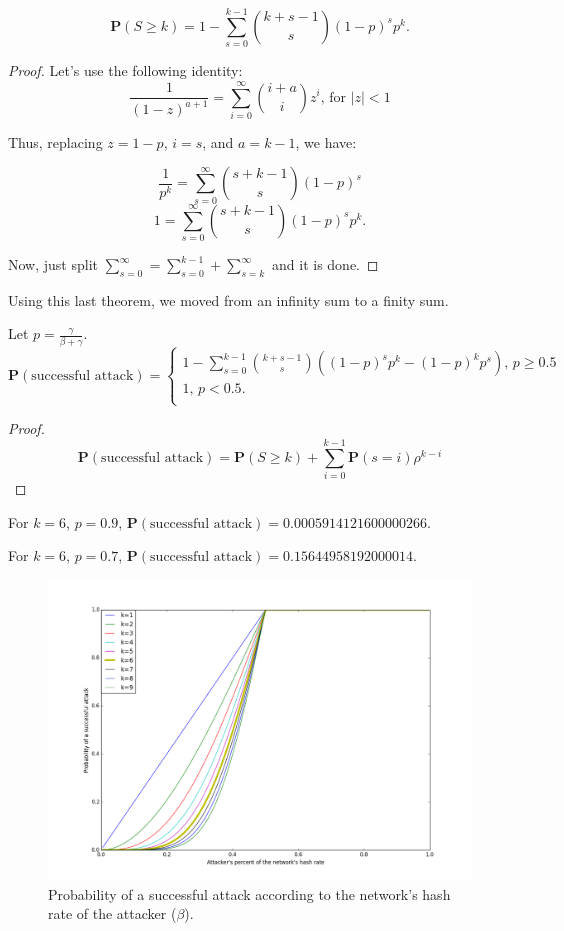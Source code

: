 \begin{theorem}
	$$\mathbf{P}(S \geq k) = 1 - \sum_{s=0}^{k-1} \binom{k+s-1}{s} (1-p)^s p^k.$$
\end{theorem}
\begin{proof}
	Let's use the following identity:
	$$\frac{1}{(1-z)^{a+1}} = \sum_{i=0}^{\infty} \binom{i+a}{i} z^i \text{, for $|z|<1$}$$

	Thus, replacing $z=1-p$, $i=s$, and $a=k-1$, we have:

	$$\frac{1}{p^{k}} = \sum_{s=0}^{\infty} \binom{s+k-1}{s} (1-p)^s$$
	$$1 = \sum_{s=0}^{\infty} \binom{s+k-1}{s} (1-p)^s p^k.$$

	Now, just split $\sum_{s=0}^{\infty} = \sum_{s=0}^{k-1} + \sum_{s=k}^{\infty}$ and it is done.
\end{proof}

Using this last theorem, we moved from an infinity sum to a finity sum.

\begin{theorem}
	Let $p = \frac{\gamma}{\beta + \gamma}$.
$$
\mathbf{P}(\text{successful attack}) =
\begin{cases}
	1 - \sum_{s=0}^{k-1} \binom{k+s-1}{s} \left( (1-p)^s p^k - (1-p)^k p^s \right) \text{, $p \geq 0.5$} \\
	1 \text{, $p < 0.5$}.\\
\end{cases}
$$
\end{theorem}
\begin{proof}
$$
\mathbf{P}(\text{successful attack}) = \mathbf{P}(S \geq k) + \sum_{i=0}^{k-1} \mathbf{P}(s=i) \rho^{k-i}
$$
\end{proof}


For $k=6$, $p=0.9$, $\mathbf{P}(\text{successful attack}) = 0.0005914121600000266$.

For $k=6$, $p=0.7$, $\mathbf{P}(\text{successful attack}) = 0.15644958192000014$.

\begin{figure}[ht]
\centering\includegraphics[width=\textwidth]{./images01/fig-bitcoin-attack.png}
\caption{Probability of a successful attack according to the network's hash rate of the attacker ($\beta$).\label{fig-bitcoin-attack}}
\end{figure}

